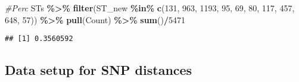 \documentclass[
]{article}
\newenvironment{Shaded}{\begin{snugshade}}{\end{snugshade}}
\newcommand{\CommentTok}[1]{\textcolor[rgb]{0.56,0.35,0.01}{\textit{#1}}}
\newcommand{\DecValTok}[1]{\textcolor[rgb]{0.00,0.00,0.81}{#1}}
\newcommand{\FunctionTok}[1]{\textcolor[rgb]{0.13,0.29,0.53}{\textbf{#1}}}
\newcommand{\NormalTok}[1]{#1}
\newcommand{\SpecialCharTok}[1]{\textcolor[rgb]{0.81,0.36,0.00}{\textbf{#1}}}
\begin{document}
\begin{Shaded}
\begin{Highlighting}[]
\CommentTok{\#Perc}
\NormalTok{STs }\SpecialCharTok{\%\textgreater{}\%} \FunctionTok{filter}\NormalTok{(ST\_new }\SpecialCharTok{\%in\%} \FunctionTok{c}\NormalTok{(}\DecValTok{131}\NormalTok{, }\DecValTok{963}\NormalTok{, }\DecValTok{1193}\NormalTok{, }\DecValTok{95}\NormalTok{, }\DecValTok{69}\NormalTok{, }\DecValTok{80}\NormalTok{, }\DecValTok{117}\NormalTok{, }\DecValTok{457}\NormalTok{, }\DecValTok{648}\NormalTok{, }\DecValTok{57}\NormalTok{)) }\SpecialCharTok{\%\textgreater{}\%} \FunctionTok{pull}\NormalTok{(Count) }\SpecialCharTok{\%\textgreater{}\%} \FunctionTok{sum}\NormalTok{()}\SpecialCharTok{/}\DecValTok{5471}
\end{Highlighting}
\end{Shaded}

\begin{verbatim}
## [1] 0.3560592
\end{verbatim}

\hypertarget{data-setup-for-snp-distances}{%
\subsection{Data setup for SNP
distances}\label{data-setup-for-snp-distances}}
\end{document}
